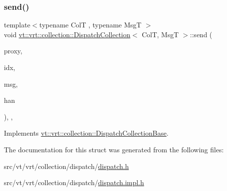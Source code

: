 \subsubsection{\texorpdfstring{send()}{send()}}
{\footnotesize\ttfamily template$<$typename ColT , typename MsgT $>$ \\
void \hyperlink{structvt_1_1vrt_1_1collection_1_1_dispatch_collection}{vt\+::vrt\+::collection\+::\+Dispatch\+Collection}$<$ ColT, MsgT $>$\+::send (\begin{DoxyParamCaption}\item[{\hyperlink{namespacevt_a1b417dd5d684f045bb58a0ede70045ac}{Virtual\+Proxy\+Type}}]{proxy,  }\item[{std\+::byte $\ast$}]{idx,  }\item[{std\+::byte $\ast$}]{msg,  }\item[{\hyperlink{namespacevt_af64846b57dfcaf104da3ef6967917573}{Handler\+Type}}]{han }\end{DoxyParamCaption})\hspace{0.3cm}{\ttfamily [override]}, {\ttfamily [private]}, {\ttfamily [virtual]}}



Implements \hyperlink{structvt_1_1vrt_1_1collection_1_1_dispatch_collection_base_a2131ae06af5b7bd699729cfd77da9563}{vt\+::vrt\+::collection\+::\+Dispatch\+Collection\+Base}.



The documentation for this struct was generated from the following files\+:\begin{DoxyCompactItemize}
\item 
src/vt/vrt/collection/dispatch/\hyperlink{src_2vt_2vrt_2collection_2dispatch_2dispatch_8h}{dispatch.\+h}\item 
src/vt/vrt/collection/dispatch/\hyperlink{src_2vt_2vrt_2collection_2dispatch_2dispatch_8impl_8h}{dispatch.\+impl.\+h}\end{DoxyCompactItemize}
